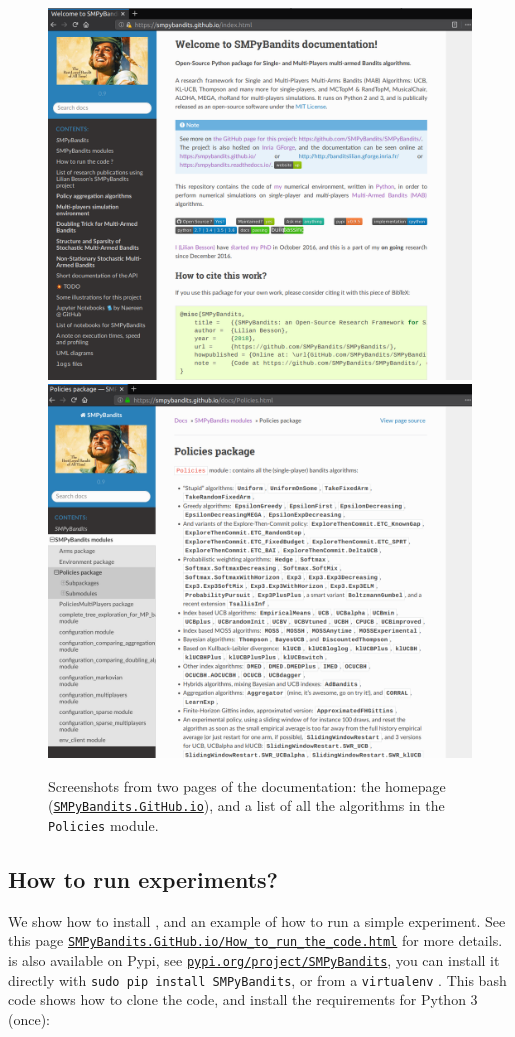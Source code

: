 \begin{figure}[h!]  %
    \centering
	\includegraphics[width=0.495\linewidth]{overview_documentation_1.png}
    \includegraphics[width=0.495\linewidth]{overview_documentation_2.png}
	\caption{Screenshots from two pages of the documentation: the homepage (\texttt{\href{https://SMPyBandits.GitHub.io}{SMPyBandits.GitHub.io}}), and a list of all the algorithms in the \texttt{Policies} module.}
	\label{fig:3:twoScreenshotsOfTheDocumentation}
\end{figure}



\subsection{How to run experiments?}

We show how to install \SMPyBandits, and an example of how to run a simple experiment.
See this page \texttt{\href{https://SMPyBandits.GitHub.io/How_to_run_the_code.html}{SMPyBandits.GitHub.io/How\_to\_run\_the\_code.html}} for more details.
\SMPyBandits{} is also available on Pypi, see \texttt{\href{https://pypi.org/project/SMPyBandits/}{pypi.org/project/SMPyBandits}}, you can install it directly with \texttt{sudo pip install SMPyBandits}, or from a \texttt{virtualenv} \cite{virtualenv}.
This bash code shows how to clone the code, and install the requirements for Python 3 (once):

